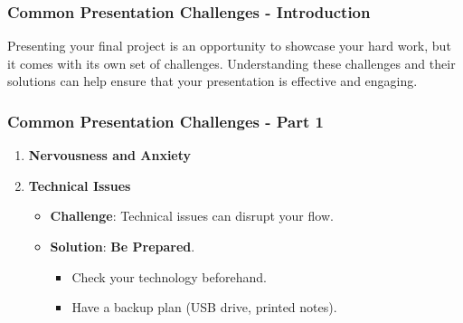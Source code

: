 \documentclass[aspectratio=169]{beamer}
\begin{document}
\begin{frame}[fragile]
    \frametitle{Common Presentation Challenges - Introduction}
    Presenting your final project is an opportunity to showcase your hard work, but it comes with its own set of challenges. Understanding these challenges and their solutions can help ensure that your presentation is effective and engaging.
\end{frame}

\begin{frame}[fragile]
    \frametitle{Common Presentation Challenges - Part 1}
    \begin{enumerate}
        \item \textbf{Nervousness and Anxiety}
        \item \textbf{Technical Issues}
          \begin{itemize}
            \item \textbf{Challenge}: Technical issues can disrupt your flow.
            \item \textbf{Solution}: \textbf{Be Prepared}.
            \begin{itemize}
                \item Check your technology beforehand.
                \item Have a backup plan (USB drive, printed notes).
            \end{itemize}
        \end{itemize}
    \end{enumerate}
\end{frame}
\end{document}
